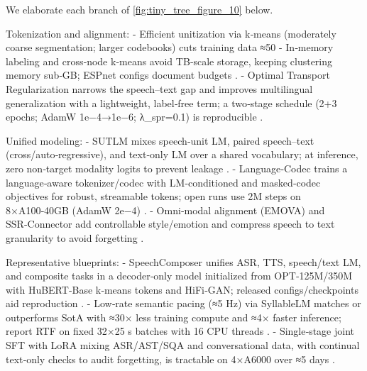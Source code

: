 We elaborate each branch of \autoref{fig:tiny_tree_figure_10} below.

Tokenization and alignment:
- Efficient unitization via k‑means (moderately coarse segmentation; larger codebooks) cuts training data ≈50%
- In‑memory labeling and cross‑node k‑means avoid TB‑scale storage, keeping clustering memory sub‑GB; ESPnet configs document budgets \cite{chen2023reducingbarriersselfsupervisedlearninghu}.
- Optimal Transport Regularization narrows the speech–text gap and improves multilingual generalization with a lightweight, label‑free term; a two‑stage schedule (2+3 epochs; AdamW 1e−4→1e−6; λ_spr=0.1) is reproducible \cite{xu2025optimaltransportregularizationspeechtext}.

Unified modeling:
- SUTLM mixes speech‑unit LM, paired speech–text (cross/auto‑regressive), and text‑only LM over a shared vocabulary; at inference, zero non‑target modality logits to prevent leakage \cite{entry2025towardjointlanguagemodelingspeechunitste,cuervo2025textspeechlanguagemodelsimprovedcrossmod,wang2024c3llmconditionalmultimodalcontentgenerat}.
- Language‑Codec trains a language‑aware tokenizer/codec with LM‑conditioned and masked‑codec objectives for robust, streamable tokens; open runs use 2M steps on 8×A100‑40GB (AdamW 2e−4) \cite{ji2025languagecodecbridgingdiscreterepresentat,kim2024enclapcombiningneuralaudiocodectextjoint,huang2024repcodecspeechrepresentationcodectokeniz}.
- Omni‑modal alignment (EMOVA) and SSR‑Connector add controllable style/emotion and compress speech to text granularity to avoid forgetting \cite{chen2025emovaempoweringlanguagemodelsseehearspea,tan2025ssralignmentawaremodalityconnectorspeech}.

Representative blueprints:
- SpeechComposer unifies ASR, TTS, speech/text LM, and composite tasks in a decoder‑only model initialized from OPT‑125M/350M with HuBERT‑Base k‑means tokens and HiFi‑GAN; released configs/checkpoints aid reproduction \cite{wu2024speechcomposerunifyingmultiplespeechtask}.
- Low‑rate semantic pacing (≈5 Hz) via SyllableLM matches or outperforms SotA with ≈30× less training compute and ≈4× faster inference; report RTF on fixed 32×25 s batches with 16 CPU threads \cite{baade2024syllablelmlearningcoarsesemanticunitsspe}.
- Single‑stage joint SFT with LoRA mixing ASR/AST/SQA and conversational data, with continual text‑only checks to audit forgetting, is tractable on 4×A6000 over ≈5 days \cite{har-tuv2025pastphoneticacousticspeechtokenizer,hsiao2025analyzingmitigationstrategiescatastrophi}.

